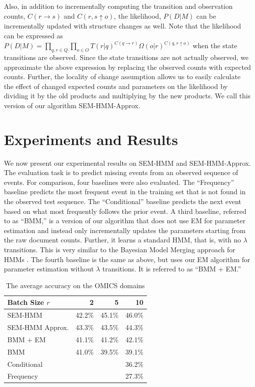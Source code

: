 \documentclass[letterpaper]{article}
\begin{document}
Also, in addition to incrementally computing the transition and observation counts, $C(r \rightarrow s)$ and $C(r,s \uparrow o)$, the likelihood, $P(D|M)$ can be incrementally updated with structure changes as well. Note that the likelihood can be expressed as $P(D|M) = \prod_{q, r \in Q} \prod_{o \in O} T(r|q)^{C(q \rightarrow r)} \Omega(o|r)^{C(q,r \uparrow o)}$ when the state transitions are observed. Since the state transitions are not actually observed, we approximate the above expression by replacing the observed counts with expected counts. Further, the locality of change assumption allows us to easily
calculate the effect of changed expected counts and parameters on the likelihood by dividing it by the old products and multiplying by the new products. We call this version of our algorithm SEM-HMM-Approx.

\section{Experiments and Results}

We now present our experimental results on SEM-HMM and SEM-HMM-Approx. The
evaluation task is to predict missing events from an observed sequence of events.
For comparison, four baselines were also evaluated.  The ``Frequency'' baseline predicts the most frequent event in the training set that is not found in the observed test sequence. The ``Conditional'' baseline predicts the next event based on what most frequently follows the prior event.  %
\vspace{-1.64mm}
\vspace{-3.28mm}
A third baseline, referred to as ``BMM,'' is a version of our algorithm that does not use EM for parameter estimation and instead only incrementally updates the parameters starting from the raw document counts. Further, it learns a standard HMM, that is, with no $\lambda$ transitions.
This is very similar to the Bayesian Model Merging approach for HMMs \cite{stolcke1994best}.
The fourth baseline is the same as above, but uses our EM algorithm for parameter estimation without $\lambda$ transitions. It is referred to as ``BMM + EM.''

\begin{table}
\footnotesize
\begin{center}
\begin{tabular}{|l|r|r|r|}
\hline
Batch Size $r$ & 2 & 5 & 10\\
\hline
SEM-HMM & 42.2\% & 45.1\% & 46.0\%\\
SEM-HMM Approx.& 43.3\% & 43.5\% & 44.3\%\\
BMM + EM & 41.1\% & 41.2\% & 42.1\%\\
BMM & 41.0\% & 39.5\% & 39.1\%\\
\hline
Conditional & \multicolumn{3}{r|}{36.2\%}\\
Frequency & \multicolumn{3}{r|}{27.3\%}\\
\hline
\end{tabular}
\caption{The average accuracy on the OMICS domains}
\end{center}
\label{table:omics}
\end{table}
\end{document}
